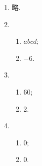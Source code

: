 % 
\begin{enumerate}
    \item %
        略.
    \item %
        \begin{enumerate}[(1)]
            \item %
                $abcd$;
            \item %
                $-6$.
        \end{enumerate}
    \item %
        \begin{enumerate}[(1)]
            \item %
                $60$;
            \item %
                $2$.
        \end{enumerate}
    \item %
        \begin{enumerate}[(1)]
            \item %
                $0$;
            \item %
                $0$.
        \end{enumerate}
\end{enumerate}
% 
